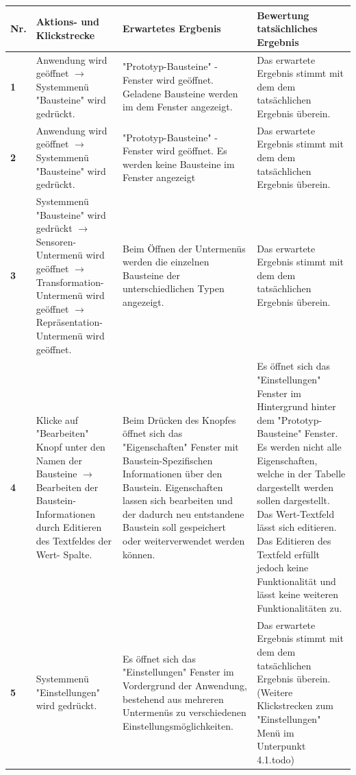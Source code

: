 \documentclass[parskip=full]{scrartcl}
\begin{document}
\begin{table}[h]
\begin{tabular}{| p{} | p{} | p{} | p{} |}
	\hline
	\textbf{Nr.} & \textbf{Aktions- und Klickstrecke} & \textbf{Erwartetes Ergbenis}  & \textbf{ Bewertung tatsächliches Ergebnis} \\ \hline
	\textbf{1}
	& 
	Anwendung wird geöffnet $\rightarrow$ Systemmenü "Bausteine" wird gedrückt.
	&
	"Prototyp-Bausteine" - Fenster wird geöffnet. Geladene Bausteine werden im dem Fenster angezeigt.
	& 
	Das erwartete Ergebnis stimmt mit dem dem tatsächlichen Ergebnis überein.
	\\ \hline
	
	\textbf{2}
	& 
	Anwendung wird geöffnet $\rightarrow$ Systemmenü "Bausteine" wird gedrückt.
	&
	"Prototyp-Bausteine" - Fenster wird geöffnet. Es werden keine Bausteine im Fenster angezeigt
	& 
	Das erwartete Ergebnis stimmt mit dem dem tatsächlichen Ergebnis überein.
	\\ \hline
	
	\textbf{3}
	& 
	Systemmenü "Bausteine" wird gedrückt $\rightarrow$ Sensoren-Untermenü wird geöffnet $\rightarrow$ Transformation-Untermenü wird geöffnet $\rightarrow$ Repräsentation-Untermenü wird geöffnet.
	&
	Beim Öffnen der Untermenüs werden die einzelnen Bausteine der unterschiedlichen Typen angezeigt.
	& 
	Das erwartete Ergebnis stimmt mit dem dem tatsächlichen Ergebnis überein.
	\\ \hline



	\textbf{4}
	& 
	Klicke auf "Bearbeiten" Knopf unter den Namen der Bausteine $\rightarrow$ Bearbeiten der Baustein-Informationen durch 
	Editieren des Textfeldes der Wert- Spalte.
	&
	Beim Drücken des Knopfes öffnet sich das "Eigenschaften" Fenster mit Baustein-Spezifischen Informationen über den 				Baustein. Eigenschaften lassen sich bearbeiten und der dadurch neu entstandene Baustein soll gespeichert oder weiterverwendet werden können.
	& 
	Es öffnet sich das "Einstellungen" Fenster im Hintergrund hinter dem "Prototyp-Bausteine" Fenster. Es werden nicht alle 			Eigenschaften, welche in der Tabelle dargestellt werden sollen dargestellt. Das Wert-Textfeld lässt sich editieren. Das				Editieren des Textfeld erfüllt jedoch keine Funktionalität und lässt keine weiteren Funktionalitäten zu.
	\\ \hline
	
	\textbf{5}
	& 
	Systemmenü "Einstellungen" wird gedrückt.
	&
	Es öffnet sich das "Einstellungen" Fenster im Vordergrund der Anwendung, bestehend aus mehreren Untermenüs zu 				verschiedenen Einstellungsmöglichkeiten.
	& 
	Das erwartete Ergebnis stimmt mit dem dem tatsächlichen Ergebnis überein.
	(Weitere Klickstrecken zum "Einstellungen" Menü im Unterpunkt 4.1.todo)
	\\ \hline

	\end{tabular}
	\end{table} 
\end{document}
